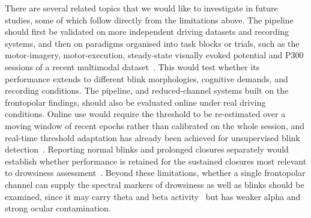 There are several related topics that we would like to investigate in future studies, some of which follow directly from the limitations above.
The pipeline should first be validated on more independent driving datasets and recording systems, and then on paradigms organised into task blocks or trials, such as the motor-imagery, motor-execution, steady-state visually evoked potential and P300 sessions of a recent multimodal dataset~\citep{guttmann2025dataset}. This would test whether its performance extends to different blink morphologies, cognitive demands, and recording conditions. The pipeline, and reduced-channel systems built on the frontopolar findings, should also be evaluated online under real driving conditions. Online use would require the threshold to be re-estimated over a moving window of recent epochs rather than calibrated on the whole session, and real-time threshold adaptation has already been achieved for unsupervised blink detection~\citep{chang2016unsupervised}. Reporting normal blinks and prolonged closures separately would establish whether performance is retained for the sustained closures most relevant to drowsiness assessment~\citep{tian2021fatigue,shahbakhti2023fusion}.
Beyond these limitations, whether a single frontopolar channel can supply the spectral markers of drowsiness as well as blinks should be examined, since it may carry theta and beta activity~\citep{ko2020eyeblink,shahbakhti2022simultaneous,aoki2023drowsiness} but has weaker alpha and strong ocular contamination.
